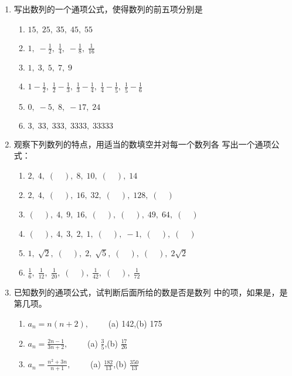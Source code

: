 \begin{ex}
\begin{enumerate}
    \item 写出数列的一个通项公式，使得数列的前五项分别是
\begin{enumerate}[(1)]
    \item $15,\; 25,\; 35,\; 45,\; 55$
    \item $1,\; -\frac{1}{2},\; \frac{1}{4},\; -\frac{1}{8},\; \frac{1}{16}$
    \item $1,\; 3,\; 5,\; 7,\; 9$
    \item $1-\frac{1}{2},\; \frac{1}{2}-\frac{1}{3},\; \frac{1}{3}-\frac{1}{4},\; \frac{1}{4}-\frac{1}{5},\; \frac{1}{5}-\frac{1}{6}$
    \item $0,\; -5,\; 8,\; -17,\; 24$
    \item $3,\; 33,\; 333,\; 3333,\; 33333$
\end{enumerate}
\item 观察下列数列的特点，用适当的数填空并对每一个数列各
写出一个通项公式：
\begin{enumerate}[(1)]
    \item $2,\; 4,\; (\quad ),\; 8,\; 10,\; (\quad ),\;14$
    \item $2,\;4,\;(\quad),\;16,\;32,\;(\quad),\;128,\;(\quad)$
    \item $(\quad),\;4,\;9,\;16,\;(\quad),\;(\quad),\;49,\;64,\;(\quad)$
    \item $(\quad),\;4,\;3,\;2,\;1,\;(\quad ),\; -1,\; (\quad ),\;(\quad )$
    \item $1,\;\sqrt{2},\;(\quad),\; 2,\;\sqrt{5},\; (\quad),\;(\quad),\; 2\sqrt{2}$
    \item $\frac{1}{6},\; \frac{1}{12},\; \frac{1}{20},\;(\quad),\;\frac{1}{42},\;(\quad),\;\frac{1}{72}$
\end{enumerate}
\item 已知数列的通项公式，试判断后面所给的数是否是数列
中的项，如果是，是第几项。
\begin{enumerate}[(1)]
    \item $a_n=n(n+2),\qquad$  (a) 142,\quad (b) 175
    \item $a_n=\frac{2n-1}{3n+2},\qquad $ (a) $\frac{3}{5}$,\quad (b) $\frac{17}{26}$
    \item $a_n=\frac{n^2+3n}{n+1},\qquad $ (a) $\frac{182}{13}$,\quad (b) $\frac{350}{13}$
\end{enumerate}
\end{enumerate}
\end{ex}

